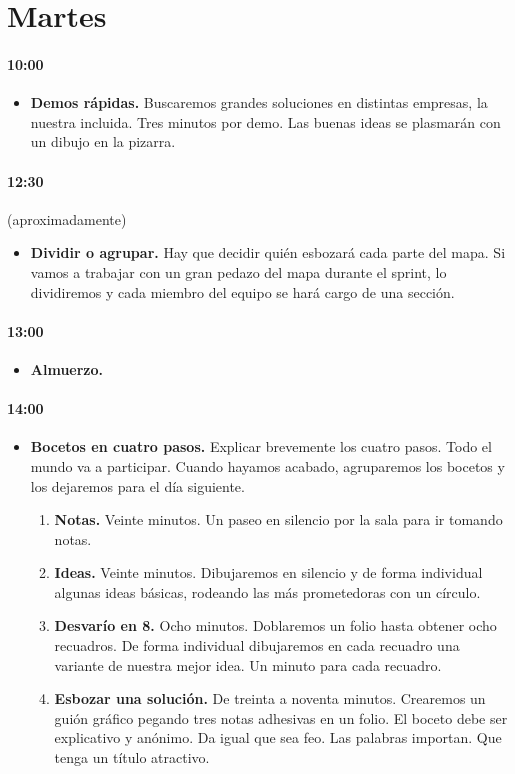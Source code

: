 \documentclass[10pt]{article}
\begin{document}
\section*{ \center Martes}
\begin{multicols}{2}
\paragraph{10:00}
\begin{itemize}
\item \textbf{Demos rápidas.} Buscaremos grandes soluciones en distintas empresas, la nuestra incluida. Tres minutos por demo. Las buenas ideas se plasmarán con un dibujo en la pizarra.
\end{itemize}
\paragraph{12:30}(aproximadamente)
\begin{itemize}
\item \textbf{Dividir o agrupar.} Hay que decidir quién esbozará cada parte del mapa. Si vamos a trabajar con un gran pedazo del mapa durante el sprint, lo dividiremos y cada miembro del equipo se hará cargo de una sección.
\end{itemize}
\paragraph{13:00}
\begin{itemize}
\item \textbf{Almuerzo.}
\end{itemize}
\paragraph{14:00}
\begin{itemize}
\item \textbf{Bocetos en cuatro pasos.} Explicar brevemente los cuatro pasos. Todo el mundo va a participar. Cuando hayamos acabado, agruparemos los bocetos y los dejaremos para el día siguiente.
\begin{enumerate}
\item \textbf{Notas.} Veinte minutos. Un paseo en silencio por la sala para ir tomando notas.
\item \textbf{Ideas.} Veinte minutos. Dibujaremos en silencio y de forma individual algunas ideas básicas, rodeando las más prometedoras con un círculo.
\item \textbf{Desvarío en 8.} Ocho minutos. Doblaremos un folio hasta obtener ocho recuadros. De forma individual dibujaremos en cada recuadro una variante de nuestra mejor idea. Un minuto para cada recuadro.
\item \textbf{Esbozar una solución.} De treinta a noventa minutos. Crearemos un guión gráfico pegando tres notas adhesivas en un folio. El boceto debe ser explicativo y anónimo. Da igual que sea feo. Las palabras importan. Que tenga un título atractivo.
\end{enumerate}
\end{itemize}

\end{multicols}
\end{document}

